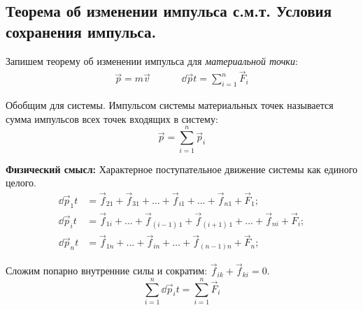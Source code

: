 \subsection{\textbf{Теорема об изменении импульса с.м.т.} Условия сохранения импульса.}

Запишем теорему об изменении импульса для \textit{материальной точки}:
\[\begin{aligned}
	\vec{p} = m\vec{v} &&&& \dd{\vec{p}}{t} = \sum_{i=1}^{n} \vec{F}_i
\end{aligned}\]

Обобщим для системы. Импульсом системы материальных точек называется сумма импульсов всех точек входящих в систему:
\[\vec{p} = \sum_{i=1}^{n} \vec{p}_i\]

\textbf{Физический смысл:} Характерное поступательное движение системы как единого целого.
\begin{align*}
	\dd{\vec{p}_1}{t} &= \vec{f}_{21} + \vec{f}_{31} + \dots + \vec{f}_{i1} + \dots + \vec{f}_{n1} + \vec{F}_1; \\
	\dd{\vec{p}_i}{t} &= \vec{f}_{1i} + \dots + \vec{f}_{(i-1) \, 1} +\vec{f}_{(i+1) \, 1} + \dots + \vec{f}_{ni} + \vec{F}_i; \\
	\dd{\vec{p}_n}{t} &= \vec{f}_{1n} + \dots + \vec{f}_{in} + \dots + \vec{f}_{(n-1)n} + \vec{F}_n;
\end{align*}

Сложим попарно внутренние силы и сократим: \(\vec{f}_{ik} + \vec{f}_{ki} = 0\).
\[\sum_{i=1}^{n} \dd{\vec{p}_i}{t} = \sum_{i=1}^{n} \vec{F}_i\]

